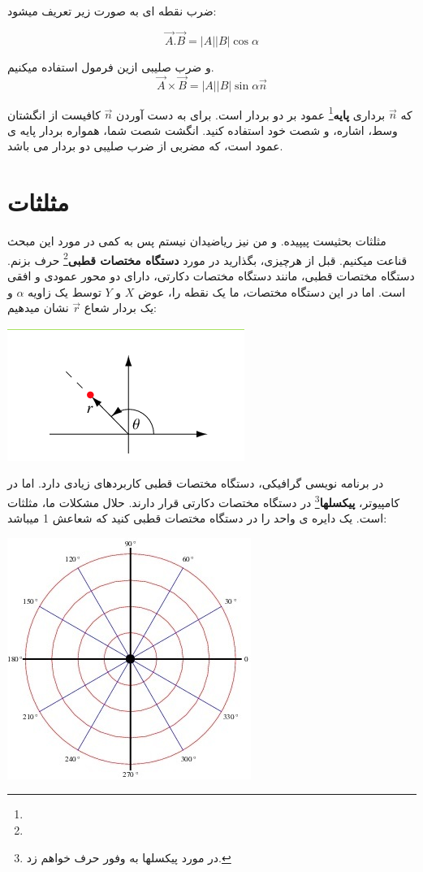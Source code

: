 \documentclass[14pt,a4paper]{memoir}
\begin{document}
	 
	 ضرب نقطه ای به صورت زیر تعریف میشود:
	 
	 \[ \vec{A}.\vec{B} = |A||B|\cos \alpha \]
	 
	 و ضرب صلیبی ازین فرمول استفاده میکنیم.
	 \[ \vec{A} \times \vec{B} = |A||B|\sin \alpha \vec{n} \]
	 
	 
	 که  $\vec{n} $ برداری \textbf{پایه}\footnote{}  عمود بر دو بردار است. برای به دست آوردن $\vec{n}$ کافیست از انگشتان وسط، اشاره، و شصت خود استفاده کنید. انگشت شصت شما، همواره بردار پایه ی عمود است، که مضربی از ضرب صلیبی دو بردار می باشد.
	 
	 
	 \section{مثلثات}\label{trig}
	 
	 مثلثات بحثیست پیپیده. و من نیز ریاضیدان نیستم پس به کمی در مورد این مبحث قناعت میکنیم.  قبل از هرچیزی، بگذارید در مورد \textbf{دستگاه مختصات قطبی}\footnote{} حرف بزنم. دستگاه مختصات قطبی، مانند دستگاه مختصات دکارتی، دارای دو محور عمودی و افقی است. اما در این دستگاه مختصات، ما یک نقطه را، عوض $ X $ و $ Y $ توسط یک زاویه $ \alpha $ و یک بردار شعاع $ \vec{r} $ نشان میدهیم:
	 
	 
	 
	 	  \begin{center}
	 	\includegraphics[scale=1]{Polar}
	 \end{center}
 
 در برنامه نویسی گرافیکی، دستگاه مختصات قطبی کاربردهای زیادی دارد. اما در کامپیوتر، \textbf{پیکسلها}\footnote{در مورد پیکسلها به وفور حرف خواهم زد.} در دستگاه مختصات دکارتی قرار دارند. حلال مشکلات ما، مثلثات است.
 یک دایره ی واحد را در دستگاه مختصات  قطبی کنید که شعاعش 1 میباشد:
  \begin{center}
 	\includegraphics[scale=1]{UnitCIrcle}
 \end{center}
\end{document}

